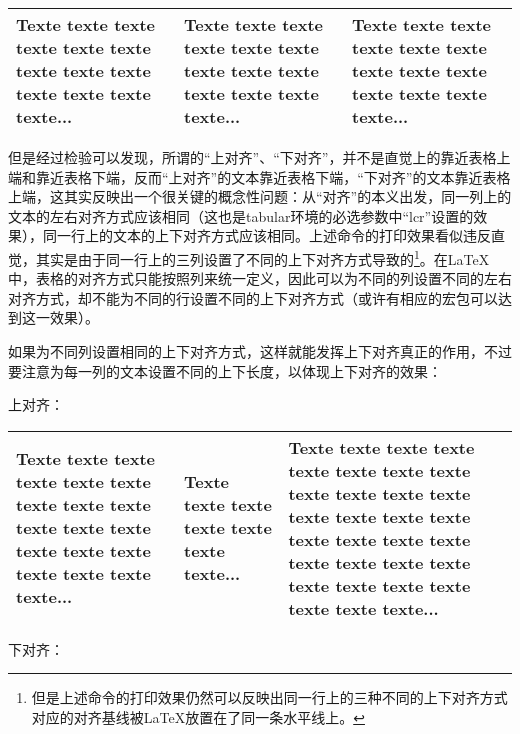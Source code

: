 ﻿\documentclass{article}
\begin{document}
    \mbox{}

    \begin{tabular}{p{8em}m{8em}b{8em}}
        \hline
        Texte texte texte texte texte texte texte
        texte texte texte texte texte texte...&
        Texte texte texte texte texte texte texte
        texte texte texte texte texte texte...&
        Texte texte texte texte texte texte texte
        texte texte texte texte texte texte...\\
        \hline
    \end{tabular}

    \mbox{}

    但是经过检验可以发现，所谓的``上对齐''、``下对齐''，并不是直觉上的靠近表格上端和靠近表格下端，反而``上对齐''的文本靠近表格下端，``下对齐''的文本靠近表格上端，这其实反映出一个很关键的概念性问题：从``对齐''的本义出发，同一列上的文本的左右对齐方式应该相同（这也是tabular环境的必选参数中``lcr''设置的效果），同一行上的文本的上下对齐方式应该相同。上述命令的打印效果看似违反直觉，其实是由于同一行上的三列设置了不同的上下对齐方式导致的\footnote{但是上述命令的打印效果仍然可以反映出同一行上的三种不同的上下对齐方式对应的对齐基线被\LaTeX 放置在了同一条水平线上。}。在\LaTeX 中，表格的对齐方式只能按照列来统一定义，因此可以为不同的列设置不同的左右对齐方式，却不能为不同的行设置不同的上下对齐方式（或许有相应的宏包可以达到这一效果）。

    如果为不同列设置相同的上下对齐方式，这样就能发挥上下对齐真正的作用，不过要注意为每一列的文本设置不同的上下长度，以体现上下对齐的效果：

    上对齐：

    \mbox{}

    \begin{tabular}{p{8em}p{8em}p{8em}}
        \hline
        Texte texte texte texte texte texte texte
        texte texte texte texte texte texte
        texte texte texte texte texte texte...&
        Texte texte texte texte texte texte texte...&
        Texte texte texte texte texte texte texte
        texte texte texte texte texte texte
        texte texte texte texte texte texte
        texte texte texte texte texte texte
        texte texte texte texte texte texte...\\
        \hline
    \end{tabular}

    \mbox{}

    下对齐：

    \mbox{}
\end{document}
